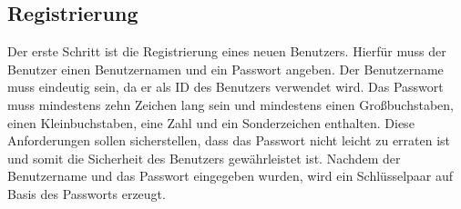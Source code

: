 \subsection{Registrierung}



Der erste Schritt ist die Registrierung eines neuen Benutzers. Hierfür muss der Benutzer einen Benutzernamen
und ein Passwort angeben. Der Benutzername muss eindeutig sein, da er als ID des Benutzers verwendet wird.
Das Passwort muss mindestens zehn Zeichen lang sein und mindestens einen Großbuchstaben, einen Kleinbuchstaben,
eine Zahl und ein Sonderzeichen enthalten. Diese Anforderungen sollen sicherstellen, dass das Passwort
nicht leicht zu erraten ist und somit die Sicherheit des Benutzers gewährleistet ist.
Nachdem der Benutzername und das Passwort eingegeben wurden, wird ein Schlüsselpaar auf 
Basis des Passworts erzeugt.


